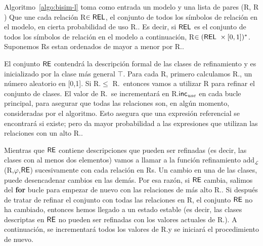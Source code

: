 

Algoritmo~\ref{algo:bisim-l} toma como entrada un modelo y una lista de pares (R, R \puse) Que une cada relaci\'on R$\in \textsf{REL} $, el conjunto de todos los s\'{i}mbolos de relaci\'on en el modelo, en cierta probabilidad de uso R.\puse.
Es decir, si $\textsf{REL}$ es el conjunto de todos los s\'{i}mbolos de relaci\'on en el modelo a continuaci\'on, R$\in (\textsf{REL} \ \times [0,1]) ^ * $. Suponemos Rs estan ordenados de mayor a menor por R.\puse.

El conjunto $\textsf{RE}$ contendr\'a la descripci\'on formal de las clases de refinamiento y es inicializado por la clase m\'as general $\top$. 
Para cada R, primero calculamos R.\randomuse, un n\'umero aleatorio en [0,1]. Si R.\randomuse$\le$ R.\puse\ entonces vamos a utilizar R para refinar el conjunto de clases. El valor de R.\puse \ se incrementar\'a en R.$\textsf{inc}_\emph{use}$ en cada bucle principal, para asegurar que todas las relaciones son, en alg\'un momento, consideradas por el algoritmo. Esto asegura que una expresi\'on referencial se encontrar\'a si existe; pero da mayor probabilidad a las expresiones que utilizan las relaciones con un alto R.\puse.

Mientras que $\textsf{RE}$ contiene descripciones que pueden ser refinadas (es decir, las clases con al menos dos elementos) vamos a llamar a la funci\'on refinamiento add$_\mathcal {L}$(R,$\varphi $,$\textsf{RE}$) sucesivamente con cada relaci\'on en Rs. Un cambio en una de las clases, puede desencadenar cambios en las dem\'as. Por esa raz\'on, si $\textsf{RE}$ cambia, salimos del \textbf {for} bucle para empezar de nuevo con las relaciones de m\'as alto R.\puse. Si despu\'es de tratar de refinar el conjunto con todas las relaciones en R, el conjunto $\textsf{RE}$ no ha cambiado, entonces hemos llegado a un estado estable (es decir, las clases descriptas en $\textsf{RE}$ no pueden ser refinadas con los valores actuales de R.\puse). A continuaci\'on, se incrementar\'a todos los valores de R.\puse y se iniciar\'a el procedimiento de nuevo.

